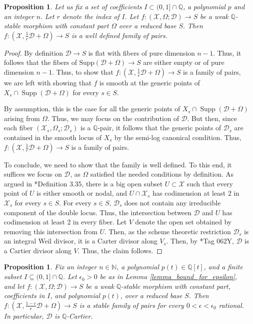 \documentclass{amsart}
\newcommand{\bQ}{\mathbb{Q}}
\newcommand{\cD}{\mathcal{D}}
\newcommand{\cX}{\mathcal{X}}
\newcommand{\supp}{\operatorname{Supp}}
\newtheorem{Prop}[theorem]{Proposition}
\theoremstyle{definition}
\newcommand{\rar}{\rightarrow}
\renewcommand{\qq}{\mathbb{Q}}
\begin{document}
\begin{Prop} \label{prop_well_defined_p-pairs}
Let us fix a set of coefficients $I \subset (0,1] \cap \qq$, a polynomial $p$ and an integer $n$.
Let $r$ denote the index of $I$.
Let $f \colon (\cX,\Omega;\cD) \rar S$ be a weak $\bQ$-stable morphism with constant part $\Omega$ over a reduced base $S$.
Then $f \colon (\cX, \frac{1}{r}\cD+\Omega) \rar S$ is a well defined family of pairs.
\end{Prop}
\begin{proof}
By definition $\cD \rar S$ is flat with fibers of pure dimension $n-1$.
Thus, it follows that the fibers of $\mathrm{Supp}(\cD + \Omega) \rar S$ are either empty or of pure dimension $n-1$.
Thus, to show that $f \colon (\cX, \frac{1}{r}\cD + \Omega) \rar S$ is a family of pairs, we are left with showing that $f$ is smooth at the generic points of $X_s \cap \supp(\cD + \Omega)$ for every $s \in S$.

By assumption, this is the case for all the generic points of $X_s \cap \supp(\cD + \Omega)$ arising from $\Omega$.
Thus, we may focus on the contribution of $\cD$.
But then, since each fiber $(\cX_s,\Omega_s;\cD_s)$ is a $\bQ$-pair, it follows that the generic points of $\cD_s$ are contained in the smooth locus of $X_s$ by the semi-log canonical condition.
Thus, $f \colon (\cX, \frac{1}{r}\cD + \Omega) \rar S$ is a family of pairs.

To conclude, we need to show that the family is well defined.
To this end, it suffices we focus on $\cD$, as $\Omega$ satisfied the needed conditions by definition.
As argued in \cite{kol_new}*{Definition 3.35}, there is a big open subset $U \subset \cX$ such that every point of $U$ is either smooth or nodal, and $U \cap \cX_s$ has codimension at least 2 in $\cX_s$ for every $s \in S$.
For every $s \in S$, $\cD_s$ does not contain any irreducible component of the double locus.
Thus, the intersection between $\cD$ and $U$ has codimension at least 2 in every fiber.
Let $V$ denote the open set obtained by removing this intersection from $U$.
Then, as the scheme theoretic restriction $\cD_s$ is an integral Weil divisor, it is a Carter divisor along $V_s$.
Then, by \cite{stacks-project}*{Tag 062Y}, $\cD$ is a Cartier divisor along $V$.
Thus, the claim follows.
\end{proof}

\begin{Prop} \label{prop_stable_family_p-pairs}
Fix an integer $n\in \mathbb{N}$, a polynomial $p(t)\in \mathbb{Q}[t]$, and a finite subset $I\subseteq (0,1] \cap \mathbb{Q}$.
Let $\epsilon_0>0$ be as in Lemma \ref{lemma_bound_for_epsilon}, and let $f \colon (\cX,\Omega;\cD) \rar S$ be a weak $\bQ$-stable morphism with constant part, coefficients in $I$, and polynomial $p(t)$, over a reduced base $S$.
Then $f \colon (\cX, \frac{1-\epsilon}{r}\cD + \Omega) \rar S$ is a stable family of pairs for every $0 < \epsilon < \epsilon_0$ rational.
In particular, $\cD$ is $\qq$-Cartier.
\end{Prop}
\end{document}
